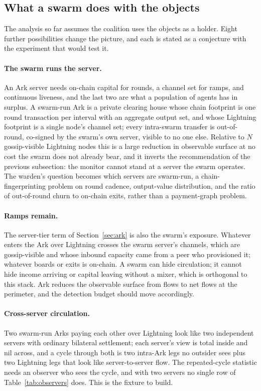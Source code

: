 \documentclass[11pt]{article}
\theoremstyle{plain}
\theoremstyle{definition}
\theoremstyle{remark}
\begin{document}
\subsection{What a swarm does with the objects}
\label{sec:swarm}

The analysis so far assumes the coalition uses the objects as a holder. Eight further possibilities change the picture, and each is stated as a conjecture with the experiment that would test it.

\paragraph{The swarm runs the server.} An Ark server needs on-chain capital for rounds, a channel set for ramps, and continuous liveness, and the last two are what a population of agents has in surplus. A swarm-run Ark is a private clearing house whose chain footprint is one round transaction per interval with an aggregate output set, and whose Lightning footprint is a single node's channel set; every intra-swarm transfer is out-of-round, co-signed by the swarm's own server, visible to no one else. Relative to $N$ gossip-visible Lightning nodes this is a large reduction in observable surface at no cost the swarm does not already bear, and it inverts the recommendation of the previous subsection: the monitor cannot stand at a server the swarm operates. The warden's question becomes which servers are swarm-run, a chain-fingerprinting problem on round cadence, output-value distribution, and the ratio of out-of-round churn to on-chain exits, rather than a payment-graph problem.

\paragraph{Ramps remain.} The server-tier term of Section~\ref{sec:ark} is also the swarm's exposure. Whatever enters the Ark over Lightning crosses the swarm server's channels, which are gossip-visible and whose inbound capacity came from a peer who provisioned it; whatever boards or exits is on-chain. A swarm can hide circulation; it cannot hide income arriving or capital leaving without a mixer, which is orthogonal to this stack. Ark reduces the observable surface from flows to net flows at the perimeter, and the detection budget should move accordingly.

\paragraph{Cross-server circulation.} Two swarm-run Arks paying each other over Lightning look like two independent servers with ordinary bilateral settlement; each server's view is total inside and nil across, and a cycle through both is two intra-Ark legs no outsider sees plus two Lightning legs that look like server-to-server flow. The repeated-cycle statistic needs an observer who sees the cycle, and with two servers no single row of Table~\ref{tab:observers} does. This is the fixture to build.
\end{document}
